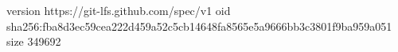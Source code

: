 version https://git-lfs.github.com/spec/v1
oid sha256:fba8d3ec59cea222d459a52c5cb14648fa8565e5a9666bb3c3801f9ba959a051
size 349692
